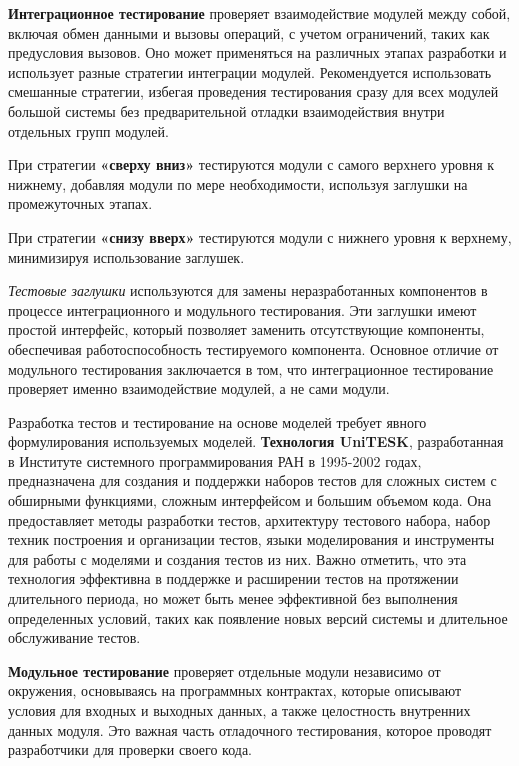 

\textbf{Интеграционное тестирование} проверяет взаимодействие модулей между собой, включая обмен данными и вызовы операций, с учетом ограничений, таких как предусловия вызовов. Оно может применяться на различных этапах разработки и использует разные стратегии интеграции модулей. Рекомендуется использовать смешанные стратегии, избегая проведения тестирования сразу для всех модулей большой системы без предварительной отладки взаимодействия внутри отдельных групп модулей.

При стратегии \textbf{«сверху вниз»} тестируются модули с самого верхнего уровня к нижнему, добавляя модули по мере необходимости, используя заглушки на промежуточных этапах.

При стратегии \textbf{«снизу вверх»} тестируются модули с нижнего уровня к верхнему, минимизируя использование заглушек.

\textit{Тестовые заглушки} используются для замены неразработанных компонентов в процессе интеграционного и модульного тестирования. Эти заглушки имеют простой интерфейс, который позволяет заменить отсутствующие компоненты, обеспечивая работоспособность тестируемого компонента. Основное отличие от модульного тестирования заключается в том, что интеграционное тестирование проверяет именно взаимодействие модулей, а не сами модули.


Разработка тестов и тестирование на основе моделей требует явного формулирования используемых моделей. \textbf{Технология UniTESK}, разработанная в Институте системного программирования РАН в 1995-2002 годах, предназначена для создания и поддержки наборов тестов для сложных систем с обширными функциями, сложным интерфейсом и большим объемом кода. Она предоставляет методы разработки тестов, архитектуру тестового набора, набор техник построения и организации тестов, языки моделирования и инструменты для работы с моделями и создания тестов из них. Важно отметить, что эта технология эффективна в поддержке и расширении тестов на протяжении длительного периода, но может быть менее эффективной без выполнения определенных условий, таких как появление новых версий системы и длительное обслуживание тестов.


\textbf{Модульное тестирование} проверяет отдельные модули независимо от окружения, основываясь на программных контрактах, которые описывают условия для входных и выходных данных, а также целостность внутренних данных модуля. Это важная часть отладочного тестирования, которое проводят разработчики для проверки своего кода.


